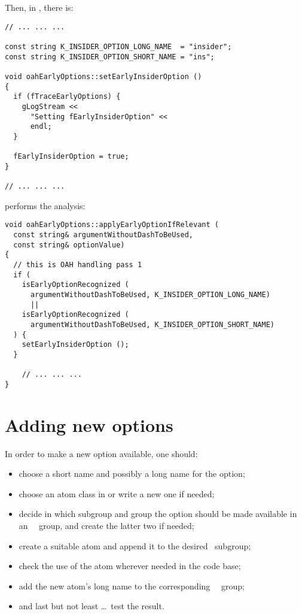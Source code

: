 Then, in , there is:
\begin{lstlisting}[language=Terminal]
// ... ... ...

const string K_INSIDER_OPTION_LONG_NAME  = "insider";
const string K_INSIDER_OPTION_SHORT_NAME = "ins";

void oahEarlyOptions::setEarlyInsiderOption ()
{
  if (fTraceEarlyOptions) {
    gLogStream <<
      "Setting fEarlyInsiderOption" <<
      endl;
  }

  fEarlyInsiderOption = true;
}

// ... ... ...
\end{lstlisting}

 performs the analysis:
\begin{lstlisting}[language=CPlusPlus]
void oahEarlyOptions::applyEarlyOptionIfRelevant (
  const string& argumentWithoutDashToBeUsed,
  const string& optionValue)
{
  // this is OAH handling pass 1
  if (
    isEarlyOptionRecognized (
      argumentWithoutDashToBeUsed, K_INSIDER_OPTION_LONG_NAME)
      ||
    isEarlyOptionRecognized (
      argumentWithoutDashToBeUsed, K_INSIDER_OPTION_SHORT_NAME)
  ) {
    setEarlyInsiderOption ();
  }

	// ... ... ...
}
\end{lstlisting}


\section{Adding new options}

In order to make a new option available, one should:
\begin{itemize}
\item choose a short name and possibly a long name for the option;
\item choose an atom class in  or write a new one if needed;
\item decide in which subgroup and group the option should be made available in an \insider\ \oahRepr\ group, and create the latter two if needed;
\item create a suitable atom and append it to the desired \oahRepr\ subgroup;
\item check the use of the atom wherever needed in the code base;
\item add the new atom's long name to the corresponding \regular\ \oahRepr\ group;
\item and last but not least \dots\ test the result.
\end{itemize}


